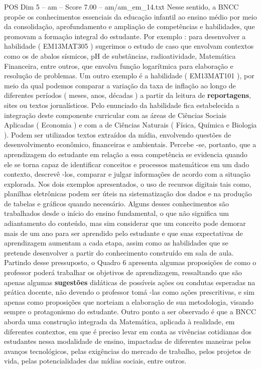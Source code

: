 \begin{textsample}{POS Dim 5 – am – Score 7.00 – am/am\_em\_14.txt}
Nesse sentido, a BNCC propõe os conhecimentos essenciais da educação infantil ao ensino médio por meio da consolidação, aprofundamento e ampliação de competências e habilidades, que promovam a formação integral do estudante.
Por exemplo : para desenvolver a habilidade ( EM13MAT305 ) sugerimos o estudo de caso que envolvam contextos como os de abalos sísmicos, pH de substâncias, radioatividade, Matemática Financeira, entre outros, que envolva função logarítmica para elaboração e resolução de problemas.
Um outro exemplo é a habilidade ( EM13MAT101 ), por meio da qual podemos comparar a variação da taxa de inflação ao longo de diferentes períodos ( meses, anos, décadas ) a partir da leitura de \textbf{reportagens}, sites ou textos jornalísticos.
Pelo enunciado da habilidade fica estabelecida a integração deste componente curricular com as áreas de Ciências Sociais Aplicadas ( Economia ) e com a de Ciências Naturais ( Física, Química e Biologia ).
Podem ser utilizados textos extraídos da mídia, envolvendo questões de desenvolvimento econômico, financeiras e ambientais.
Percebe -se, portanto, que a aprendizagem do estudante em relação a essa competência se evidencia quando ele se torna capaz de identificar conceitos e processos matemáticos em um dado contexto, descrevê -los, comparar e julgar informações de acordo com a situação explorada.
Nos dois exemplos apresentados, o uso de recursos digitais tais como, planilhas eletrônicas podem ser úteis na sistematização dos dados e na produção de tabelas e gráficos quando necessário.
Alguns desses conhecimentos são trabalhados desde o início do ensino fundamental, o que não significa um adiantamento do conteúdo, mas sim considerar que um conceito pode demorar mais de um ano para ser aprendido pelo estudante e que suas expectativas de aprendizagem aumentam a cada etapa, assim como as habilidades que se pretende desenvolver a partir do conhecimento construído em sala de aula.
Partindo desse pressuposto, o Quadro 6 apresenta algumas proposições de como o professor poderá trabalhar os objetivos de aprendizagem, ressaltando que são apenas algumas \textbf{sugestões} didáticas de possíveis ações ou condutas esperadas na prática docente, não devendo o professor tomá -las como ações prescritivas, e sim apenas como proposições que norteiam a elaboração de sua metodologia, visando sempre o protagonismo do estudante.
Outro ponto a ser observado é que a BNCC aborda uma construção integrada da Matemática, aplicada à realidade, em diferentes contextos, em que é preciso levar em conta as vivências cotidianas dos estudantes nessa modalidade de ensino, impactadas de diferentes maneiras pelos avanços tecnológicos, pelas exigências do mercado de trabalho, pelos projetos de vida, pelas potencialidades das mídias sociais, entre outros.

\end{textsample}
